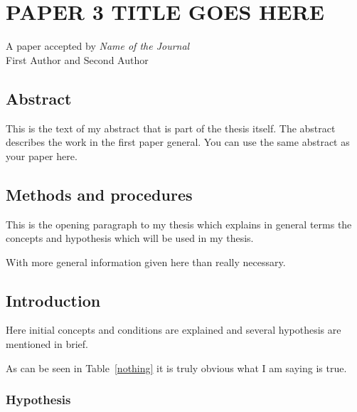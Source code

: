 \chapter{PAPER 3 TITLE GOES HERE}

\begin{center}
    A paper accepted by \textit{Name of the Journal} \\
    First Author and Second Author
\end{center}

\section{Abstract}
This is the text of my abstract that is part of the thesis itself.
The abstract describes the work in the first paper general. You can use the same abstract as your paper here.



\section{Methods and procedures}

This is the opening paragraph to my thesis which
explains in general terms the concepts and hypothesis
which will be used in my thesis.

With more general information given here than really
necessary.

\section{Introduction}

Here initial concepts and conditions are explained and
several hypothesis are mentioned in brief.

As can be seen in Table~\ref{nothing} it is truly
obvious what I am saying is true.

\begin{table}[h!tb] \centering
{}
\label{nothing}

\vspace{ 2 in}
\end{table}

\subsection{Hypothesis}

